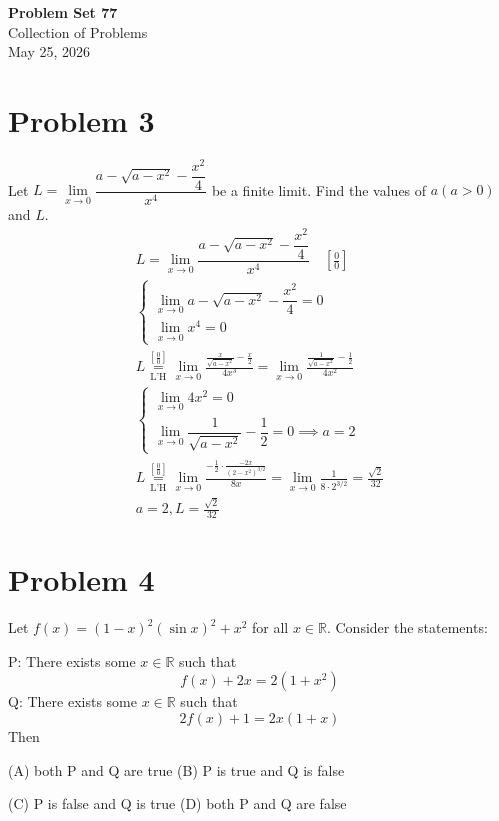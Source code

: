 \documentclass[12pt]{article}
\newcommand*{\lheqzero}{\ensuremath{\underset{\text{L'H}}{\overset{\left[\frac00\right]}{=}}}}
\newcommand{\vem}{\vspace{0.5em}}
\newcommand{\problem}[1]{\section{Problem #1}}
\begin{document}
\vspace*{0cm}

\begin{center}
    {\Large \bfseries Problem Set 77} \\[0.5cm]
    {\large Collection of Problems} \\[0.35cm]
    {\normalsize May 25, 2026}
\end{center}


\problem{3}
Let $L=\lim\limits_{x\to 0} \dfrac{a-\sqrt{a-x^2}-\dfrac{x^2}{4}}{x^4}$ be a finite limit. Find the values of $a(a>0)$ and $L$.
\begin{gather*}
    L=\lim\limits_{x\to 0} \dfrac{a-\sqrt{a-x^2}-\dfrac{x^2}{4}}{x^4} \quad \left[\frac{0}{0}\right]\\
    \begin{cases}
        \lim\limits_{x\to 0} a-\sqrt{a-x^2}-\dfrac{x^2}{4}=0\\
        \lim\limits_{x\to 0} x^4 =0
    \end{cases}\\
    L \lheqzero \lim\limits_{x\to 0}\frac{\frac{x}{\sqrt{a-x^2}}-\frac{x}{2}}{4x^3} = \lim\limits_{x\to 0}\frac{\frac{1}{\sqrt{a-x^2}}-\frac{1}{2}}{4x^2}\\
    \begin{cases}
        \lim\limits_{x\to 0} 4x^2=0\\
        \lim\limits_{x\to 0} \dfrac{1}{\sqrt{a-x^2}}-\dfrac{1}{2}=0 \implies a=2
    \end{cases}\\
    L\lheqzero \lim\limits_{x\to 0}\frac{-\frac{1}{2}\cdot \frac{-2x}{(2-x^2)^{3/2}}}{8x}= \lim\limits_{x\to 0} \frac{1}{8\cdot 2^{3/2}}=\frac{\sqrt{2}}{32}\\
    \boxed{a=2, L=\frac{\sqrt{2}}{32}}
\end{gather*}

\problem{4}
Let $f(x)=(1-x)^2(\sin x)^2+x^2$ for all $x\in \mathbb{R}$. Consider the statements: \vem

P: There exists some $x\in \mathbb{R}$ such that
\[
f(x)+2x=2(1+x^2)
\]
Q: There exists some $x\in \mathbb{R}$ such that
\[
2f(x)+1=2x(1+x)
\]
Then \vem

(A) both P and Q are true \quad (B) P is true and Q is false \vem

(C) P is false and Q is true \quad (D) both P and Q are false\vem
\end{document}
